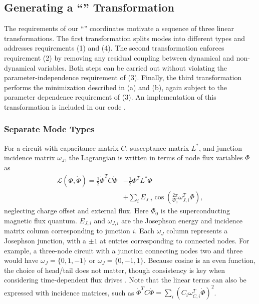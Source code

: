 \subsection{Generating a ``\Canonical'' Transformation}

The requirements of our ``\canonical'' coordinates motivate a sequence of three linear transformations. The first transformation splits modes into different types and addresses requirements (1) and (4). The second transformation enforces requirement (2) by removing any residual coupling between dynamical and non-dynamical variables. 
Both steps can be carried out without violating the parameter-independence requirement of (3).
Finally, the third transformation performs the minimization described in (a) and (b), again subject to the parameter dependence requirement of (3). 
An implementation of this transformation is included in our code \cite{sircuitenum_repo}.



\subsubsection{Separate Mode Types}

For a circuit with capacitance matrix $C$, susceptance matrix $L^*$, and junction incidence matrix $\omega_J$, the Lagrangian is written in terms of node flux variables $\Phi$ as
\begin{align}\label{eq:node_lagrangian}
    \mathcal{L}(\Phi, \dot \Phi) = \frac{1}{2}\dot\Phi^TC\dot\Phi &- \frac{1}{2}\Phi^TL^*\Phi  \nonumber \\ &+ \sum_iE_{J,i}\cos\left(\frac{2\pi}{\Phi_0}\omega_{J,i}^T\Phi\right),
\end{align}
neglecting charge offset and external flux. Here $\Phi_0$ is the superconducting magnetic flux quantum. $E_{J,i}$ and $\omega_{J,i}$ are the Josephson energy and incidence matrix column corresponding to junction $i$. Each $\omega_J$ column represents a Josephson junction, with a $\pm1$ at entries corresponding to connected nodes. For example, a three-node circuit with a junction connecting nodes two and three would have $\omega_J = \{0,1,-1\}$ or $\omega_J = \{0,-1,1\}$. Because cosine is an even function, the choice of head/tail does not matter, though consistency is key when considering time-dependent flux drives \cite{rajabzadehAnalysisArbitrarySuperconducting2023}. Note that the linear terms can also be expressed with incidence matrices, such as $\dot\Phi^TC\dot\Phi = \sum_i(C_i\omega_{C,i}^T\dot \Phi)^2$.


